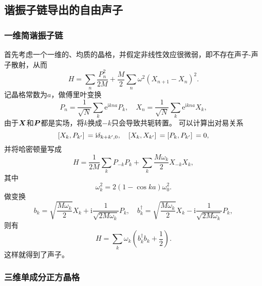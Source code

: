 \documentclass[hyperref, UTF8, a4paper]{ctexart}
\newcommand*{\ii}{\mathrm{i}}
\newcommand*{\ee}{\mathrm{e}}
\begin{document}
\subsection{谐振子链导出的自由声子}

\subsubsection{一维简谐振子链}

首先考虑一个一维的、均质的晶格，并假定非线性效应很微弱，即不存在声子-声子散射，从而
\begin{equation}
    {H} = \sum_n \frac{{P}_n^2}{2 M} + \frac{M}{2} \sum_{n} \omega^2 ({X}_{n+1} - {X}_{n})^2.
    \label{eq:one-dim-osc-hamiltonian}
\end{equation}
记晶格常数为$a$，做傅里叶变换
\[
    {P}_n = \frac{1}{\sqrt{N}} \sum_{k} \ee^{\ii k n a} {P}_k, \quad {X}_n = \frac{1}{\sqrt{N}} \sum_{k} \ee^{\ii k n a} {X}_k,
\]
由于$\vb*{X}$和$\vb*{P}$都是实场，将$k$换成$-k$只会导致共轭转置。
可以计算出对易关系
\begin{equation}
    \comm*{{X}_{k}}{{P}_{k'}} = \ii \delta_{k+k', 0}, \quad \comm*{{X}_{k}}{{X}_{k'}} = \comm*{{P}_{k}}{{P}_{k'}} = 0,
\end{equation}
并将哈密顿量写成
\[
    {H} = \frac{1}{2M} \sum_{k} {P}_{-k} {P}_{k} + \sum_k \frac{M \omega_{k}}{2} {X}_{-k} {X}_k,
\]
其中
\begin{equation}
    \omega_k^2 = 2 (1 - \cos k a) \omega_0^2.
\end{equation}
做变换
\begin{equation}
    {b}_{k} = \sqrt{\frac{M \omega_k}{2}} {X}_k + \ii \frac{1}{\sqrt{2 M \omega_k}} P_k, \quad {b}^\dagger_{k} = \sqrt{\frac{M \omega_k}{2}} {X}_k - \ii \frac{1}{\sqrt{2 M \omega_k}} P_k,
\end{equation}
则有
\begin{equation}
    {H} = \sum_k \omega_k \left({b}^\dagger_k {b}_k + \frac{1}{2}\right).
\end{equation}
这样就得到了声子。

\subsubsection{三维单成分正方晶格}
\end{document}
